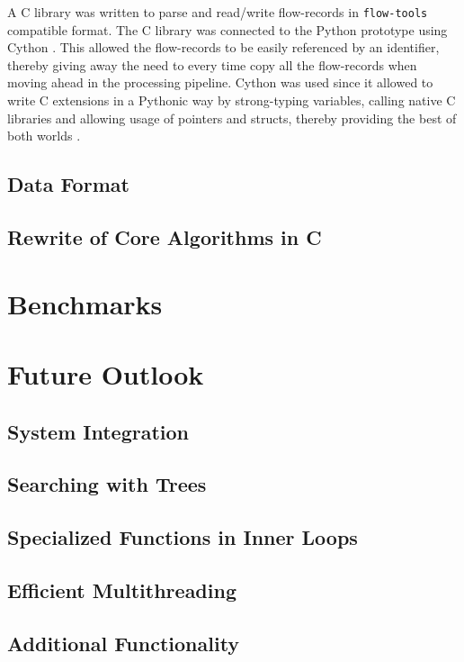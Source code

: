 A C library was written to parse and read/write flow-records in \texttt{flow-tools} compatible format. The C library was connected to the Python prototype using Cython \cite{dseljebotn:2009}\cite{wilbers:2009}. This allowed the flow-records to be easily referenced by an identifier, thereby giving away the need to every time copy all the flow-records when moving ahead in the processing pipeline. Cython was used since it allowed to write C extensions in a Pythonic way by strong-typing variables, calling native C libraries and allowing usage of pointers and structs, thereby providing the best of both worlds \cite{sbehnel:2011}. 

\subsection{Data Format}\label{subsec:data-format}
\subsection{Rewrite of Core Algorithms in C}\label{subsec:core-alg-c}

\section{Benchmarks}\label{sec:benchmarks}
\section{Future Outlook}\label{sec:flowy2-future}
	\subsection{System Integration}\label{subsec:system-integration}
	\subsection{Searching with Trees}\label{subsec:search-trees}
	\subsection{Specialized Functions in Inner Loops}\label{subsec:special-fns}
	\subsection{Efficient Multithreading}\label{subsec:multithreading}
	\subsection{Additional Functionality}\label{subsec:additional-functionality}